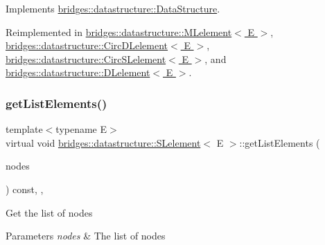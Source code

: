 Implements \hyperlink{classbridges_1_1datastructure_1_1_data_structure_a4ff66cb34409f11fe9fc647f6d8a22ce}{bridges\+::datastructure\+::\+Data\+Structure}.



Reimplemented in \hyperlink{classbridges_1_1datastructure_1_1_m_lelement_a735c3cb43648b4d4e7d3316cdc1a1952}{bridges\+::datastructure\+::\+M\+Lelement$<$ E $>$}, \hyperlink{classbridges_1_1datastructure_1_1_circ_d_lelement_aec7f9b9dc6626c1a872feb91cd65425d}{bridges\+::datastructure\+::\+Circ\+D\+Lelement$<$ E $>$}, \hyperlink{classbridges_1_1datastructure_1_1_circ_s_lelement_a775ba08a7811fe91c396cb27ba9343ab}{bridges\+::datastructure\+::\+Circ\+S\+Lelement$<$ E $>$}, and \hyperlink{classbridges_1_1datastructure_1_1_d_lelement_a736ba8e6901608fb0ab04d781d2cceee}{bridges\+::datastructure\+::\+D\+Lelement$<$ E $>$}.

\mbox{\label{classbridges_1_1datastructure_1_1_s_lelement_a81b68786cb93fe0f7edb48af789535a5}} 
\subsubsection{\texorpdfstring{get\+List\+Elements()}{getListElements()}}
{\footnotesize\ttfamily template$<$typename E$>$ \\
virtual void \hyperlink{classbridges_1_1datastructure_1_1_s_lelement}{bridges\+::datastructure\+::\+S\+Lelement}$<$ E $>$\+::get\+List\+Elements (\begin{DoxyParamCaption}\item[{vector$<$ const \hyperlink{classbridges_1_1datastructure_1_1_s_lelement}{S\+Lelement}$<$ E $>$ $\ast$$>$ \&}]{nodes }\end{DoxyParamCaption}) const\hspace{0.3cm}{\ttfamily [inline]}, {\ttfamily [protected]}, {\ttfamily [virtual]}}

Get the list of nodes


\begin{DoxyParams}{Parameters}
{\em nodes} & The list of nodes \\
\hline
\end{DoxyParams}
\mbox{\label{classbridges_1_1datastructure_1_1_s_lelement_ae43dd771d9ced7cb17f1d35f34cd9a42}} 
